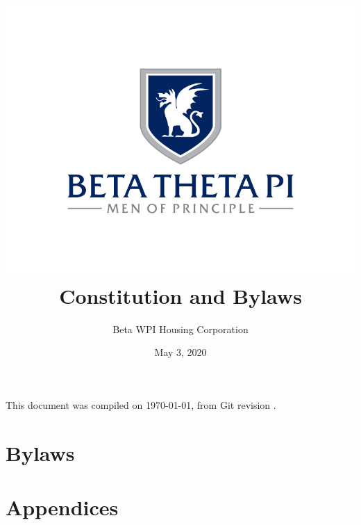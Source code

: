 \documentclass[12pt]{report}
\title{%
    \includegraphics[width=\textwidth]{btp_tone.jpg}\\[1cm]
    Constitution and Bylaws
}
\author{Beta WPI Housing Corporation}
\date{May 3, 2020}
\begin{document}


\begin{titlepage}
\maketitle
\end{titlepage}
\begin{center}
	\small This document was compiled on \today, from Git revision \Revision.
\end{center}
\clearpage

\setcounter{tocdepth}{1}
\tableofcontents
\clearpage

\setcounter{chapter}{0}
\renewcommand\chaptername{Item}
\part{Bylaws}

\part{Appendices}
\appendix

\end{document}
